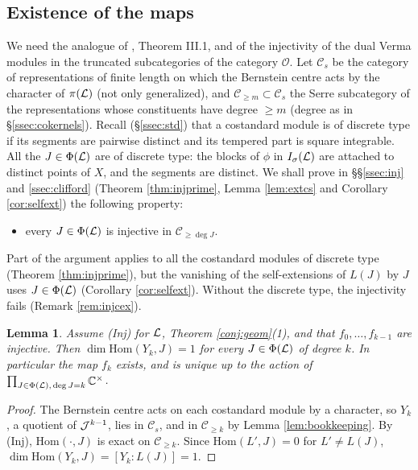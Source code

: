 \documentclass[a4paper,12pt,leqno]{amsart}
\theoremstyle{plain}
\newtheorem{lemma}[thm]{Lemma}
\theoremstyle{definition}
\begin{document}
\subsection{Existence of the maps}

\noindent We need the analogue of \cite{Joh84}, Theorem III.1, and of the
injectivity of the dual Verma modules in the truncated subcategories of the category $\mathcal{O}$.
Let $\mathcal{C}_s$ be the category of representations of finite length on which the Bernstein centre
acts by the character of $\pi(\mathcal{L})$ (not only generalized), and $\mathcal{C}_{\geq m}\subset
\mathcal{C}_s$ the Serre subcategory of the representations whose constituents have degree $\geq m$ (degree as
in \S\ref{ssec:cokernels}).
Recall (\S\ref{ssec:std}) that a costandard module is of discrete type if its segments are pairwise
distinct and its tempered part is square integrable. All the $J\in\Phi(\mathcal{L})$ are of discrete type: the blocks of $\phi$ in $I_\sigma(\mathcal{L})$ are
attached to distinct points of $X$, and the segments are distinct.
We shall prove in \S\S\ref{ssec:inj} and \ref{ssec:clifford} (Theorem \ref{thm:injprime}, Lemma
\ref{lem:extcs} and Corollary \ref{cor:selfext}) the following property:
\begin{itemize}
\item[(Inj)] every $J\in\Phi(\mathcal{L})$ is injective in $\mathcal{C}_{\geq\deg J}$.
\end{itemize}
Part of the argument applies to all the costandard modules of discrete type (Theorem
\ref{thm:injprime}), but the vanishing of the self-extensions of $L(J)$ by $J$ uses $J\in\Phi(\mathcal{L})$
(Corollary \ref{cor:selfext}). Without the discrete type, the injectivity fails (Remark \ref{rem:injcex}).

\begin{lemma}\label{lem:existence} Assume (Inj) for $\mathcal{L}$, Theorem \ref{conj:geom}(1), and that
$f_0,\ldots,f_{k-1}$ are injective. Then $\dim\mathrm{Hom}(Y_k,J)=1$ for every $J\in\Phi(\mathcal{L})$ of degree $k$. In
particular the map $f_k$ exists, and is unique up to the action of $\prod_{J\in\Phi(\mathcal{L}),\,\deg J=k}\mathbb{C}^\times$.
\end{lemma}

\begin{proof}
The Bernstein centre acts on each costandard module by a character, so $Y_k$, a quotient of $\mathcal{J}^{k-1}$, lies in
$\mathcal{C}_s$, and in $\mathcal{C}_{\geq k}$ by Lemma \ref{lem:bookkeeping}. By (Inj),
$\mathrm{Hom}(\cdot,J)$ is exact on $\mathcal{C}_{\geq k}$. Since $\mathrm{Hom}(L',J)=0$ for $L'\neq L(J)$,
$\dim\mathrm{Hom}(Y_k,J)=[Y_k:L(J)]=1$.
\end{proof}
\end{document}
